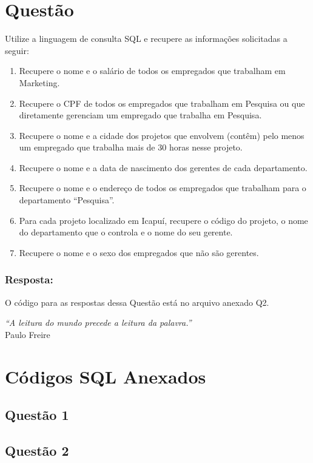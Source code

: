 \documentclass[a4paper,12pt]{article}
\begin{document}
\vspace{1cm}

\section{ Questão}
Utilize a linguagem de consulta SQL e recupere as informações solicitadas a seguir:
\begin{enumerate}[label=\alph*)]
    \item Recupere o nome e o salário de todos os empregados que trabalham em Marketing.
    \item Recupere o CPF de todos os empregados que trabalham em Pesquisa ou que diretamente gerenciam um empregado que trabalha em Pesquisa.
    \item Recupere o nome e a cidade dos projetos que envolvem (contêm) pelo menos um empregado que trabalha mais de 30 horas nesse projeto.
    \item Recupere o nome e a data de nascimento dos gerentes de cada departamento.
    \item Recupere o nome e o endereço de todos os empregados que trabalham para o departamento “Pesquisa”.
    \item Para cada projeto localizado em Icapuí, recupere o código do projeto, o nome do departamento que o controla e o nome do seu gerente.
    \item Recupere o nome e o sexo dos empregados que não são gerentes.
\end{enumerate}
\subsubsection*{Resposta:}
O código para as respostas dessa Questão está no arquivo anexado Q2.
\vspace{1cm}

\begin{flushright}
\textit{“A leitura do mundo precede a leitura da palavra.”}\\
Paulo Freire
\end{flushright}

\newpage
\section{Códigos SQL Anexados}
\subsection{Questão 1}

\newpage
\subsection{Questão 2}

\end{document}
